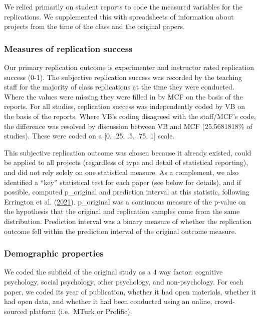 \documentclass[
  english,
  a4paper,
]{article}
\begin{document}
We relied primarily on student reports to code the measured variables for the replications. We supplemented this with spreadsheets of information about projects from the time of the class and the original papers.

\hypertarget{measures-of-replication-success}{%
\subsubsection{Measures of replication success}\label{measures-of-replication-success}}

Our primary replication outcome is experimenter and instructor rated replication success (0-1). The subjective replication success was recorded by the teaching staff for the majority of class replications at the time they were conducted. Where the values were missing they were filled in by MCF on the basis of the reports. For all studies, replication success was independently coded by VB on the basis of the reports. Where VB's coding disagreed with the staff/MCF's code, the difference was resolved by discussion between VB and MCF (25.5681818\% of studies). These were coded on a {[}0, .25, .5, .75, 1{]} scale.

This subjective replication outcome was chosen because it already existed, could be applied to all projects (regardless of type and detail of statistical reporting), and did not rely solely on one statistical measure. As a complement, we also identified a ``key'' statistical test for each paper (see below for details), and if possible, computed p\_original and prediction interval at this statistic, following Errington et al. (\protect\hyperlink{ref-errington2021}{2021}). p\_original was a continuous measure of the p-value on the hypothesis that the original and replication samples come from the same distribution. Prediction interval was a binary measure of whether the replication outcome fell within the prediction interval of the original outcome measure.

\hypertarget{demographic-properties}{%
\subsubsection{Demographic properties}\label{demographic-properties}}

We coded the subfield of the original study as a 4 way factor: cognitive psychology, social psychology, other psychology, and non-psychology. For each paper, we coded its year of publication, whether it had open materials, whether it had open data, and whether it had been conducted using an online, crowd-sourced platform (i.e.~MTurk or Prolific).
\end{document}
